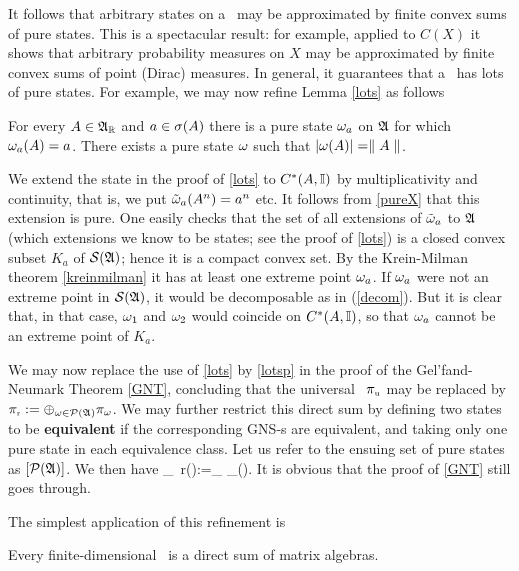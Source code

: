 It follows that arbitrary states on a \ca\ may be approximated by
finite convex sums of pure states.  This is a spectacular result: for
example, applied to $C(X)$ it shows that arbitrary probability
measures on $X$ may be approximated by finite convex sums of point
(Dirac) measures.  In general, it guarantees that a \ca\ has lots of
pure states. For example, we may now refine Lemma \ref{lots} as
follows
\begin{Theorem}
For every $A\in{\frak A}_{\Bbb R}$ and $a\in\sigma(A)$ there is a pure state $\omega_a$ on
${\frak A}$ for which $\omega_a(A)=a$. There exists a pure state $\omega$ such that
$|\omega(A)|=\parallel A\parallel$.
\end{Theorem}

We extend the state in the proof of \ref{lots} to $C^*(A,{\Bbb I})$ by
multiplicativity and continuity, that is, we put
$\tilde{\omega}_a(A^n)=a^n$ etc. It follows from \ref{pureX} that this
extension is pure. One easily checks that the set of all extensions of
$\tilde{\omega}_a$ to ${\frak A}$ (which extensions we know to be states; see the
proof of \ref{lots}) is a closed convex subset $K_a$ of ${\cal S}({\frak A})$; hence
it is a compact convex set. By the Krein-Milman theorem
\ref{kreinmilman} it has at least one extreme point $\omega_a$.  If
$\omega_a$ were not an extreme point in ${\cal S}({\frak A})$, it would be decomposable
as in (\ref{decom}).  But it is clear that, in that case, $\omega_1$ and
$\omega_2$ would coincide on $C^*(A,{\Bbb I})$, so that $\omega_a$ cannot be an
extreme point of $K_a$.\enp

We may now replace the use of \ref{lots} by \ref{lotsp} in the proof
of the Gel'fand-Neumark Theorem \ref{GNT}, concluding that the
universal \rep\ $\pi_{\mbox{\tiny u}}$ may be replaced by
$\pi_{\mbox{\tiny r}}:=\oplus_{\omega\in{\cal P}({\frak A})}\pi_{\omega}$.  We may further
restrict this direct sum by defining two states to be {\bf equivalent}
if the corresponding GNS-\rep s are equivalent, and taking only one
pure state in each equivalence class. Let us refer to the ensuing set
of pure states as $[{\cal P}({\frak A})]$.  We then have \be \A\simeq\pi_{\mbox{\tiny
r}}(\A):=\oplus_{\om\in [\PA]} \pi_{\om}(\A).   \ee It is
obvious that the proof of \ref{GNT} still goes through.

The simplest application of this refinement is
\begin{Proposition}
Every finite-dimensional \ca\ is a direct sum of matrix algebras.
\end{Proposition}


